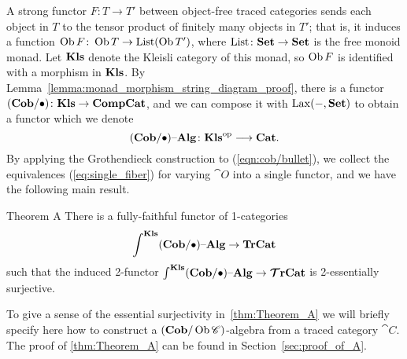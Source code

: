 \documentclass[12pt,oneside,article,draft]{memoir}
\begin{document}
A strong functor $F\colon T\to T'$ between object-free traced categories sends each object in $T$ to the tensor product of finitely many objects in $T'$; that is, it induces a function $\operatorname{Ob} F\colon\operatorname{Ob} T\to\textnormal{List}(\operatorname{Ob} T')$, where $\textnormal{List}\colon\mathbf{Set}\to\mathbf{Set}$ is the free monoid monad. Let $\mathbf{Kls}$ denote the Kleisli category of this monad, so $\operatorname{Ob} F$ is identified with a morphism in $\mathbf{Kls}$. By Lemma~\ref{lemma:monad_morphism_string_diagram_proof}, there is a functor $(\mathbf{Cob}/\bullet)\colon\mathbf{Kls}\to\mathbf{CompCat}$, and we can compose it with $\operatorname{Lax}(-,\mathbf{Set})$ to obtain a functor which we denote
\begin{equation}\label{eqn:cob/bullet}
(\mathbf{Cob}/\bullet){\text \textendash}\mathbf{Alg}\colon{\mathbf{Kls}}^{\text{op}}\longrightarrow\mathbf{Cat}.
\end{equation}
By applying the Grothendieck construction to (\ref{eqn:cob/bullet}), we collect the equivalences (\ref{eq:single_fiber}) for varying $\cat{O}$ into a single functor, and we have the following main result.

\begin{named}{Theorem A}\label{thm:Theorem_A}
   There is a fully-faithful functor of 1-categories
   \begin{equation*}
      \int^{\mathbf{Kls}}(\mathbf{Cob}/\bullet){\text \textendash}\mathbf{Alg} \to \mathbf{TrCat}
   \end{equation*}
   such that the induced 2-functor $\int^{\mathbf{Kls}}(\mathbf{Cob}/\bullet){\text \textendash}\mathbf{Alg}\to\bm{\mathcal{T}}\mathbf{rCat}$ is 2-essentially surjective.
\end{named}

To give a sense of the essential surjectivity in~\ref{thm:Theorem_A} we will briefly specify here how to construct a
$(\mathbf{Cob}/\operatorname{Ob}\mathscr{C})$-algebra from a traced category $\cat{C}$. The proof of \ref{thm:Theorem_A} can be found in Section~\ref{sec:proof_of_A}. 
\end{document}

